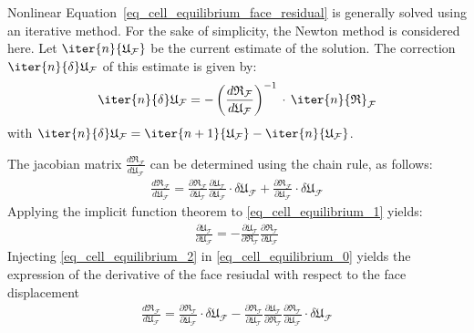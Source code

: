 Nonlinear Equation~\eqref{eq_cell_equilibrium_face_residual} is
generally solved using an iterative method. For the sake of simplicity,
the Newton method is considered here. Let
\(\iter{n}{\mathfrak{U}_{\mathcal{F}}}\) be the current estimate of the
solution. The correction \(\iter{n}{\delta}\mathfrak{U}_{\mathcal{F}}\)
of this estimate is given by:
\[
\iter{n}{\delta}\mathfrak{U}_{\mathcal{F}}=
-\left( \frac{d\mathfrak{R}_{\mathcal{F}}}{d \mathfrak{U}_{\mathcal{F}}}
\right)^{-1} \,\cdot\,\iter{n}{\mathfrak{R}}_{\mathcal{F}}
\]
with
\(\iter{n}{\delta}\mathfrak{U}_{\mathcal{F}}=\iter{n+1}{\mathfrak{U}_{\mathcal{F}}}-\iter{n}{\mathfrak{U}_{\mathcal{F}}}\).


The jacobian matrix \(\frac{d\mathfrak{R}_{\mathcal{F}}}{d
  \mathfrak{U}_{\mathcal{F}}}\) can be determined using the chain rule,
as follows:
\begin{equation}
  \label{eq_cell_equilibrium_0}
  \begin{aligned}
    \frac{d\mathfrak{R}_{\mathcal{F}}}{d
      \mathfrak{U}_{\mathcal{F}}}
    = \frac{\partial
      \mathfrak{R}_{\mathcal{F}}}{\partial \mathfrak{U}_{\mathcal{T}}}
    \frac{\partial \mathfrak{U}_{\mathcal{T}}}{\partial
      \mathfrak{U}_{\mathcal{F}}} \cdot \delta
    \mathfrak{U}_{\mathcal{F}} + \frac{\partial
      \mathfrak{R}_{\mathcal{F}}}{\partial \mathfrak{U}_{\mathcal{F}}}
    \cdot \delta \mathfrak{U}_{\mathcal{F}}
  \end{aligned}
\end{equation}
Applying the implicit function theorem to
\eqref{eq_cell_equilibrium_1} yields:
\begin{equation}
  \label{eq_cell_equilibrium_2}
  \begin{aligned}
    \frac{\partial
      \mathfrak{U}_{\mathcal{T}}}{\partial \mathfrak{U}_{\mathcal{F}}} =
    - \frac{\partial \mathfrak{U}_{\mathcal{T}}}{\partial
      \mathfrak{R}_{\mathcal{T}}} \frac{\partial
      \mathfrak{R}_{\mathcal{T}}}{\partial \mathfrak{U}_{\mathcal{F}}}
  \end{aligned}
\end{equation}
Injecting \eqref{eq_cell_equilibrium_2} in
\eqref{eq_cell_equilibrium_0} yields the expression of the derivative of
the face resiudal with respect to the face displacement
\begin{equation}
  \label{eq_cell_equilibrium_3}
  \begin{aligned}
    \frac{d\mathfrak{R}_{\mathcal{F}}}{d
      \mathfrak{U}_{\mathcal{F}}} = \frac{\partial
      \mathfrak{R}_{\mathcal{T}}}{\partial \mathfrak{U}_{\mathcal{F}}}
    \cdot \delta \mathfrak{U}_{\mathcal{F}} - \frac{\partial
      \mathfrak{R}_{\mathcal{T}}}{\partial \mathfrak{U}_{\mathcal{T}}}
    \frac{\partial \mathfrak{U}_{\mathcal{T}}}{\partial
      \mathfrak{R}_{\mathcal{T}}} \frac{\partial
      \mathfrak{R}_{\mathcal{T}}}{\partial \mathfrak{U}_{\mathcal{F}}}
    \cdot \delta \mathfrak{U}_{\mathcal{F}}
  \end{aligned}
\end{equation}

